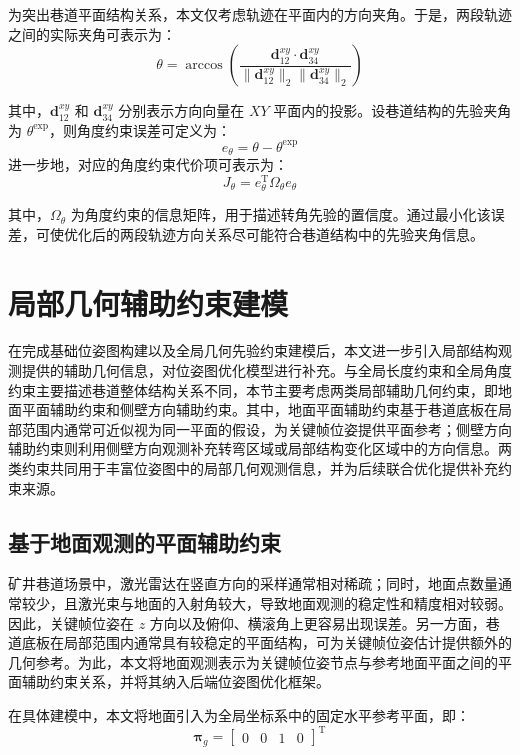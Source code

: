 为突出巷道平面结构关系，本文仅考虑轨迹在平面内的方向夹角。于是，两段轨迹之间的实际夹角可表示为：
\begin{equation}
\theta=
\arccos
\left(
\frac{
\mathbf{d}_{12}^{xy}\cdot \mathbf{d}_{34}^{xy}
}{
\|\mathbf{d}_{12}^{xy}\|_2\|\mathbf{d}_{34}^{xy}\|_2
}
\right)
\end{equation}

其中，$\mathbf{d}_{12}^{xy}$ 和 $\mathbf{d}_{34}^{xy}$ 分别表示方向向量在 $XY$ 平面内的投影。设巷道结构的先验夹角为 $\theta^{\mathrm{exp}}$，则角度约束误差可定义为：
\begin{equation}
e_\theta=\theta-\theta^{\mathrm{exp}}
\end{equation}
进一步地，对应的角度约束代价项可表示为：
\begin{equation}
J_\theta=e_\theta^{\mathrm T}\Omega_\theta e_\theta
\end{equation}

其中，$\Omega_\theta$ 为角度约束的信息矩阵，用于描述转角先验的置信度。通过最小化该误差，可使优化后的两段轨迹方向关系尽可能符合巷道结构中的先验夹角信息。
\section{局部几何辅助约束建模}

在完成基础位姿图构建以及全局几何先验约束建模后，本文进一步引入局部结构观测提供的辅助几何信息，对位姿图优化模型进行补充。与全局长度约束和全局角度约束主要描述巷道整体结构关系不同，本节主要考虑两类局部辅助几何约束，即地面平面辅助约束和侧壁方向辅助约束。其中，地面平面辅助约束基于巷道底板在局部范围内通常可近似视为同一平面的假设，为关键帧位姿提供平面参考；侧壁方向辅助约束则利用侧壁方向观测补充转弯区域或局部结构变化区域中的方向信息。两类约束共同用于丰富位姿图中的局部几何观测信息，并为后续联合优化提供补充约束来源。

\subsection{基于地面观测的平面辅助约束}

矿井巷道场景中，激光雷达在竖直方向的采样通常相对稀疏；同时，地面点数量通常较少，且激光束与地面的入射角较大，导致地面观测的稳定性和精度相对较弱。因此，关键帧位姿在 $z$ 方向以及俯仰、横滚角上更容易出现误差。另一方面，巷道底板在局部范围内通常具有较稳定的平面结构，可为关键帧位姿估计提供额外的几何参考。为此，本文将地面观测表示为关键帧位姿节点与参考地面平面之间的平面辅助约束关系，并将其纳入后端位姿图优化框架。

在具体建模中，本文将地面引入为全局坐标系中的固定水平参考平面，即：
\begin{equation}
\boldsymbol{\pi}_g=
\begin{bmatrix}
0 & 0 & 1 & 0
\end{bmatrix}^{\mathrm T}
\end{equation}

